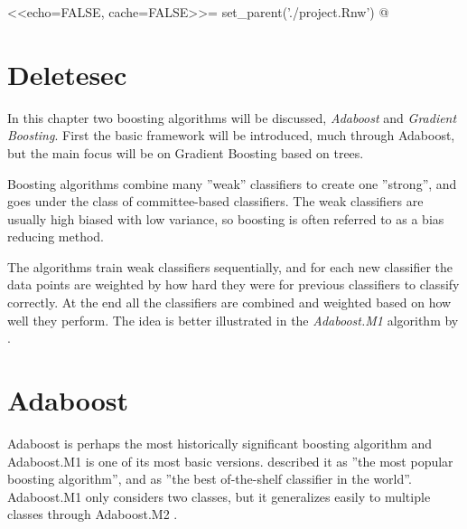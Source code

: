 <<echo=FALSE, cache=FALSE>>=
set_parent('./project.Rnw')
@
\section{Deletesec}

In this chapter two boosting algorithms will be discussed, \textit{Adaboost} and \textit{Gradient Boosting}. First the basic framework will be introduced, much through Adaboost, but the main focus will be on Gradient Boosting based on trees. 

Boosting algorithms combine many ''weak'' classifiers to create one ''strong'', and goes under the class of committee-based classifiers. The weak classifiers are usually high biased with low variance, so boosting is often referred to as a bias reducing method. 

The algorithms train weak classifiers sequentially, and for each new classifier the data points are weighted by how hard they were for previous classifiers to classify correctly. At the end all the classifiers are combined and weighted based on how well they perform. The idea is better illustrated in the \textit{Adaboost.M1} algorithm by  \cite{adaboostM1}.
\section{Adaboost}
\label{sec:Adaboost}
Adaboost is perhaps the most historically significant boosting algorithm and Adaboost.M1 is one of its most basic versions. \cite{modstat} described it as ''the most popular boosting algorithm'', and \cite{Breiman1996} as ''the best of-the-shelf classifier in the world''. Adaboost.M1 only considers two classes, but it generalizes easily to multiple classes through Adaboost.M2 \citep{adaboostM1}. 


